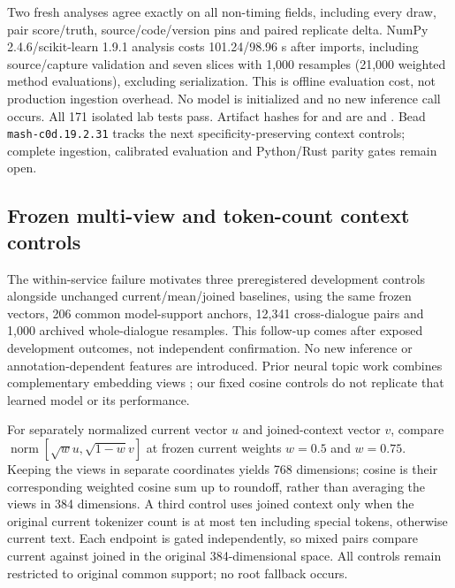 \documentclass[11pt]{article}
\begin{document}
Two fresh analyses agree exactly on all non-timing fields, including every draw,
pair score/truth, source/code/version pins and paired replicate delta. NumPy
2.4.6/scikit-learn 1.9.1 analysis costs 101.24/98.96 s after imports, including
source/capture validation and seven slices with 1,000 resamples (21,000 weighted
method evaluations), excluding serialization. This is offline evaluation cost,
not production ingestion overhead. No model is initialized and no new inference
call occurs. All 171 isolated lab tests pass. Artifact hashes for
 and  are
and .
Bead \texttt{mash-c0d.19.2.31} tracks the next specificity-preserving context controls;
complete ingestion, calibrated evaluation and Python/Rust parity gates remain open.

\subsection{Frozen multi-view and token-count context controls}
The within-service failure motivates three preregistered development controls
alongside unchanged current/mean/joined baselines, using the same frozen vectors,
206 common model-support anchors, 12,341 cross-dialogue pairs and 1,000 archived
whole-dialogue resamples. This follow-up comes after exposed development outcomes,
not independent confirmation. No new inference or annotation-dependent features
are introduced. Prior neural topic work combines complementary embedding views
\cite{multiviewtopics}; our fixed cosine controls do not replicate that learned
model or its performance.

For separately normalized current vector $u$ and joined-context vector $v$, compare
$\operatorname{norm}[\sqrt{w}u,\sqrt{1-w}v]$ at frozen current weights $w=0.5$
and $w=0.75$. Keeping the views in separate coordinates yields 768 dimensions;
cosine is their corresponding weighted cosine sum up to roundoff, rather than
averaging the views in 384 dimensions. A third control uses joined context only
when the original current tokenizer count is at most ten including special tokens,
otherwise current text. Each endpoint is gated independently, so mixed pairs
compare current against joined in the original 384-dimensional space. All
controls remain restricted to original common support; no root fallback occurs.
\end{document}
